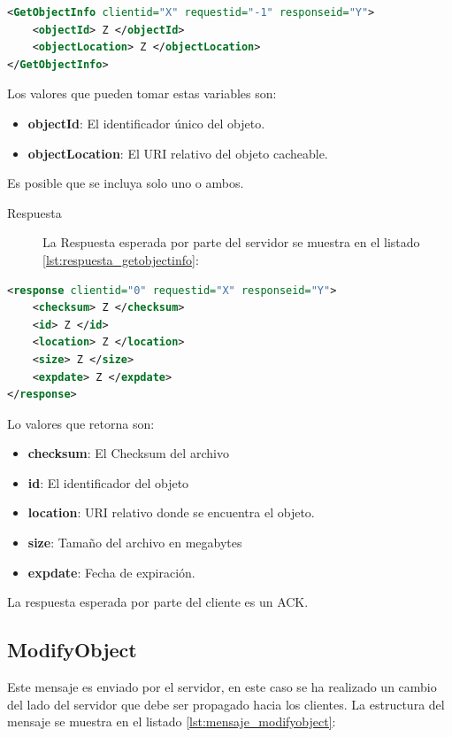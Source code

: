 \begin{lstlisting}[language=XML,caption={Mensaje de GetObjectInfo},label={lst:mensaje_getobjectinfo}]
<GetObjectInfo clientid="X" requestid="-1" responseid="Y"> 
	<objectId> Z </objectId>
	<objectLocation> Z </objectLocation>
</GetObjectInfo>
\end{lstlisting}

Los valores que pueden tomar estas variables son:

\begin{itemize}
\item \textbf{objectId}: El identificador único del objeto.
\item \textbf{objectLocation}: El URI relativo del objeto cacheable.
\end{itemize}

Es posible que se incluya solo uno o ambos.

\begin{description}
\item[Respuesta] La Respuesta esperada por parte del servidor se muestra en el listado \ref{lst:respuesta_getobjectinfo}:
\end{description}

\begin{lstlisting}[language=XML,caption={Mensaje de Respuesta de GetObjectInfo},label={lst:respuesta_getobjectinfo}]
<response clientid="0" requestid="X" responseid="Y"> 
	<checksum> Z </checksum>
	<id> Z </id>
	<location> Z </location>
	<size> Z </size>
	<expdate> Z </expdate>
</response>
\end{lstlisting}

Lo valores que retorna son:

\begin{itemize}
\item \textbf{checksum}:  El Checksum del archivo
\item \textbf{id}: El identificador del objeto
\item \textbf{location}: URI relativo donde se encuentra el objeto.
\item \textbf{size}: Tamaño del archivo en megabytes
\item \textbf{expdate}: Fecha de expiración.
\end{itemize}


La respuesta esperada por parte del cliente es un ACK.

\subsection{ModifyObject}
Este mensaje es enviado por el servidor, en este caso se ha realizado un cambio del lado del servidor que debe ser propagado hacia los clientes. La estructura del mensaje se muestra en el listado \ref{lst:mensaje_modifyobject}:

